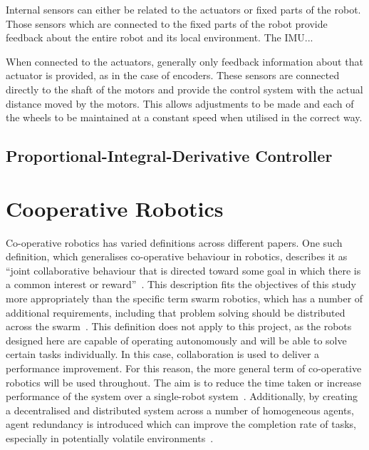 Internal sensors can either be related to the actuators or fixed parts of the robot. Those sensors which are connected to the fixed parts of the robot provide feedback about the entire robot and its local environment. The IMU...

When connected to the actuators, generally only feedback information about that actuator is provided, as in the case of encoders. These sensors are connected directly to the shaft of the motors and provide the control system with the actual distance moved by the motors. This allows adjustments to be made and each of the wheels to be maintained at a constant speed when utilised in the correct way.

\subsection{Proportional-Integral-Derivative Controller}\label{litreview/pid}


\section{Cooperative Robotics}\label{litreview/coop}
Co-operative robotics has varied definitions across different papers. One such
definition, which generalises co-operative behaviour in robotics, describes it as ``joint
collaborative behaviour that is directed toward some goal in which there is a
common interest or reward''~\cite{barnes1991behaviour}. This description fits the
objectives of this study more appropriately than the specific term swarm robotics, which
has a number of additional requirements, including
that problem solving should be distributed across the swarm~\cite{sahin04}.
This definition does not apply to this project, as the robots designed
here are capable of operating autonomously and will be able to solve certain tasks
individually. In this case, collaboration is used to deliver a performance improvement.
For this reason, the more general term of co-operative robotics will
be used throughout. The aim is to reduce the time taken or increase performance of the system over
a single-robot system~\cite{premvuti1990consideration}. Additionally, by creating a decentralised
and distributed system across a number of homogeneous agents, agent redundancy is introduced which
can improve the completion rate of tasks, especially in potentially volatile
environments~\cite{beckers1994local, parker95}.

